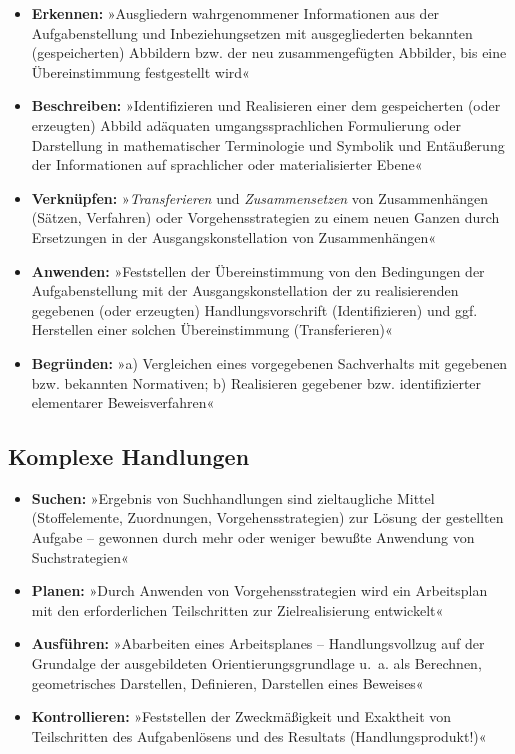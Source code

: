 \documentclass[
]{scrbook}
\providecommand{\tightlist}{%
  \setlength{\itemsep}{0pt}\setlength{\parskip}{0pt}}
\theoremstyle{definition}
\theoremstyle{definition}
\theoremstyle{definition}
\theoremstyle{definition}
\theoremstyle{remark}
\begin{document}
\begin{itemize}
\tightlist
\item
  \textbf{Erkennen:} »Ausgliedern wahrgenommener Informationen aus der Aufgabenstellung und Inbeziehungsetzen mit ausgegliederten bekannten (gespeicherten) Abbildern bzw. der neu zusammengefügten Abbilder, bis eine Übereinstimmung festgestellt wird«
\item
  \textbf{Beschreiben:} »Identifizieren und Realisieren einer dem gespeicherten (oder erzeugten) Abbild adäquaten umgangssprachlichen Formulierung oder Darstellung in mathematischer Terminologie und Symbolik und Entäußerung der Informationen auf sprachlicher oder materialisierter Ebene«
\item
  \textbf{Verknüpfen:} »\emph{Transferieren} und \emph{Zusammensetzen} von Zusammenhängen (Sätzen, Verfahren) oder Vorgehensstrategien zu einem neuen Ganzen durch Ersetzungen in der Ausgangskonstellation von Zusammenhängen«
\item
  \textbf{Anwenden:} »Feststellen der Übereinstimmung von den Bedingungen der Aufgabenstellung mit der Ausgangskonstellation der zu realisierenden gegebenen (oder erzeugten) Handlungsvorschrift (Identifizieren) und ggf. Herstellen einer solchen Übereinstimmung (Transferieren)«
\item
  \textbf{Begründen:} »a) Vergleichen eines vorgegebenen Sachverhalts mit gegebenen bzw. bekannten Normativen; b) Realisieren gegebener bzw. identifizierter elementarer Beweisverfahren«
\end{itemize}

\hypertarget{komplexe-handlungen}{%
\subsection{Komplexe Handlungen}\label{komplexe-handlungen}}

\begin{itemize}
\tightlist
\item
  \textbf{Suchen:} »Ergebnis von Suchhandlungen sind zieltaugliche Mittel (Stoffelemente, Zuordnungen, Vorgehensstrategien) zur Lösung der gestellten Aufgabe -- gewonnen durch mehr oder weniger bewußte Anwendung von Suchstrategien«
\item
  \textbf{Planen:} »Durch Anwenden von Vorgehensstrategien wird ein Arbeitsplan mit den erforderlichen Teilschritten zur Zielrealisierung entwickelt«
\item
  \textbf{Ausführen:} »Abarbeiten eines Arbeitsplanes -- Handlungsvollzug auf der Grundalge der ausgebildeten Orientierungsgrundlage u.~a. als Berechnen, geometrisches Darstellen, Definieren, Darstellen eines Beweises«
\item
  \textbf{Kontrollieren:} »Feststellen der Zweckmäßigkeit und Exaktheit von Teilschritten des Aufgabenlösens und des Resultats (Handlungsprodukt!)«
\end{itemize}
\end{document}
